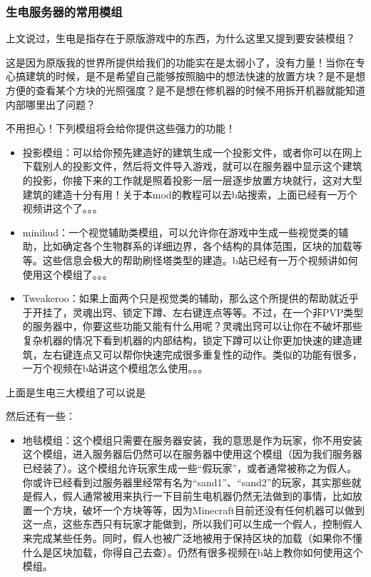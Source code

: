 \documentclass[
]{article}
\providecommand{\tightlist}{%
  \setlength{\itemsep}{0pt}\setlength{\parskip}{0pt}}
\begin{document}
\subsubsection{生电服务器的常用模组}\label{section-9}

上文说过，生电是指存在于原版游戏中的东西，为什么这里又提到要安装模组？

这是因为原版我的世界所提供给我们的功能实在是太弱小了，没有力量！当你在专心搞建筑的时候，是不是希望自己能够按照脑中的想法快速的放置方块？是不是想方便的查看某个方块的光照强度？是不是想在修机器的时候不用拆开机器就能知道内部哪里出了问题？

不用担心！下列模组将会给你提供这些强力的功能！

\begin{itemize}
\item
  投影模组：可以给你预先建造好的建筑生成一个投影文件，或者你可以在网上下载别人的投影文件，然后将文件导入游戏，就可以在服务器中显示这个建筑的投影，你接下来的工作就是照着投影一层一层逐步放置方块就行，这对大型建筑的建造十分有用！关于本mod的教程可以去b站搜索，上面已经有一万个视频讲这个了。。。
\item
  minihud：一个视觉辅助类模组，可以允许你在游戏中生成一些视觉类的辅助，比如确定各个生物群系的详细边界，各个结构的具体范围，区块的加载等等。这些信息会极大的帮助刷怪塔类型的建造。b站已经有一万个视频讲如何使用这个模组了。。。
\item
  Tweakeroo：如果上面两个只是视觉类的辅助，那么这个所提供的帮助就近乎于开挂了，灵魂出窍、锁定下蹲、左右键连点等等。不过，在一个非PVP类型的服务器中，你要这些功能又能有什么用呢？灵魂出窍可以让你在不破坏那些复杂机器的情况下看到机器的内部结构，锁定下蹲可以让你更加快速的建造建筑，左右键连点又可以帮你快速完成很多重复性的动作。类似的功能有很多，一万个视频在b站讲这个模组怎么使用。。。
\end{itemize}

上面是生电三大模组了可以说是

然后还有一些：

\begin{itemize}
\tightlist
\item
  地毯模组：这个模组只需要在服务器安装，我的意思是作为玩家，你不用安装这个模组，进入服务器后仍然可以在服务器中使用这个模组（因为我们服务器已经装了）。这个模组允许玩家生成一些``假玩家''，或者通常被称之为假人。你或许已经看到过服务器里经常有名为``sand1''、``sand2''的玩家，其实那些就是假人，假人通常被用来执行一下目前生电机器仍然无法做到的事情，比如放置一个方块，破坏一个方块等等，因为Minecraft目前还没有任何机器可以做到这一点，这些东西只有玩家才能做到，所以我们可以生成一个假人，控制假人来完成某些任务。同时，假人也被广泛地被用于保持区块的加载（如果你不懂什么是区块加载，你得自己去查）。仍然有很多视频在b站上教你如何使用这个模组。
\end{itemize}
\end{document}
